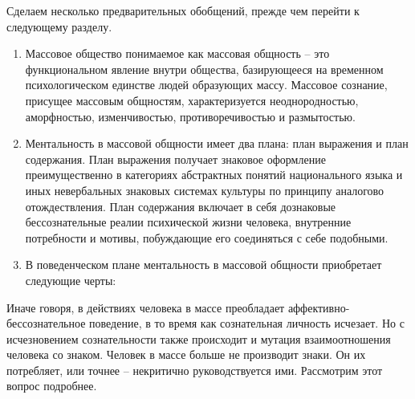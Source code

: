 Сделаем несколько предварительных обобщений, прежде чем перейти к следующему разделу.
\begin{enumerate}
    \item Массовое общество понимаемое как массовая общность -- это функциональном явление внутри общества,
    базирующееся на временном психологическом единстве людей образующих массу. Массовое сознание,
    присущее массовым общностям, характеризуется неоднородностью, аморфностью, изменчивостью,
    противоречивостью и размытостью.
    \item Ментальность в массовой общности имеет два плана: план выражения и план содержания.
    План выражения получает знаковое оформление преимущественно в категориях абстрактных понятий
    национального языка и иных невербальных знаковых системах культуры по принципу аналогово отождествления.
    План содержания включает в себя дознаковые бессознательные реалии психической жизни человека, внутренние
    потребности и мотивы, побуждающие его соединяться с себе подобными.
    \item В поведенческом плане ментальность в массовой общности приобретает следующие черты:
\end{enumerate}

Иначе говоря, в действиях человека в массе преобладает аффективно-бессознательное поведение,
в то время как сознательная личность исчезает. Но с исчезновением сознательности также происходит и
мутация взаимоотношения человека со знаком. Человек в массе больше не производит знаки.
Он их потребляет, или точнее -- некритично руководствуется ими. Рассмотрим этот вопрос подробнее.
